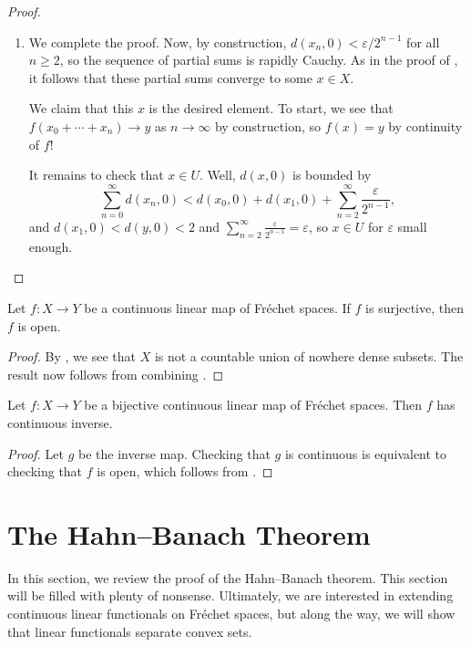 \documentclass[notes.tex]{subfiles}
\begin{document}
\begin{proof}
\begin{enumerate}
		\item We complete the proof. Now, by construction, $d(x_n,0)<\varepsilon/2^{n-1}$ for all $n\ge2$, so the sequence of partial sums is rapidly Cauchy. As in the proof of , it follows that these partial sums converge to some $x\in X$.
		
		We claim that this $x$ is the desired element. To start, we see that $f(x_0+\cdots+x_n)\to y$ as $n\to\infty$ by construction, so $f(x)=y$ by continuity of $f$!

		It remains to check that $x\in U$. Well, $d(x,0)$ is bounded by
		\[\sum_{n=0}^\infty d(x_n,0)<d(x_0,0)+d(x_1,0)+\sum_{n=2}^\infty\frac\varepsilon{2^{n-1}},\]
		and $d(x_1,0)<d(y,0)<2$ and $\sum_{n=2}^\infty\frac\varepsilon{2^{n-1}}=\varepsilon$, so $x\in U$ for $\varepsilon$ small enough.
		\qedhere
	\end{enumerate}
\end{proof}
\begin{theorem} \label{thm:omt}
	Let $f\colon X\to Y$ be a continuous linear map of Fr\'echet spaces. If $f$ is surjective, then $f$ is open.
\end{theorem}
\begin{proof}
	By , we see that $X$ is not a countable union of nowhere dense subsets. The result now follows from combining .
\end{proof}
\begin{corollary}
	Let $f\colon X\to Y$ be a bijective continuous linear map of Fr\'echet spaces. Then $f$ has continuous inverse.
\end{corollary}
\begin{proof}
	Let $g$ be the inverse map. Checking that $g$ is continuous is equivalent to checking that $f$ is open, which follows from .
\end{proof}

\section{The Hahn--Banach Theorem}
In this section, we review the proof of the Hahn--Banach theorem. This section will be filled with plenty of nonsense. Ultimately, we are interested in extending continuous linear functionals on Fr\'echet spaces, but along the way, we will show that linear functionals separate convex sets.
\end{document}
